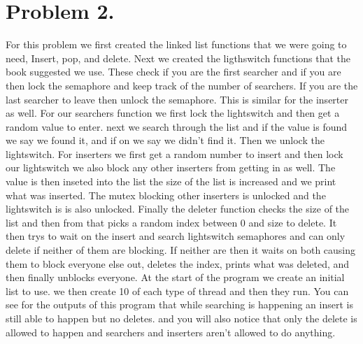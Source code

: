 \documentclass[letterpaper,10pt,titlepage]{article}
\begin{document}
\section{Problem 2.} For this problem we first created the linked list functions 
that we were going to need, Insert, pop, and delete. Next we created the 
ligthswitch functions that the book suggested we use. These check if you are 
the first searcher and if you are then lock the semaphore and keep track of 
the number of searchers. If you are the last searcher to leave then unlock 
the semaphore. This is similar for the inserter as well. For our searchers 
function we first lock the lightswitch and then get a random value to enter. 
next we search through the list and if the value is found we say we found it, 
and if on we say we didn't find it. Then we unlock the lightswitch. For 
inserters we first get a random number to insert and then lock our lightswitch 
we also block any other inserters from getting in as well. The value is then 
inseted into the list the size of the list is increased and we print what was 
inserted. The mutex blocking other inserters is unlocked and the lightswitch is 
is also unlocked. Finally the deleter function checks the size of the list and 
then from that picks a random index between 0 and size to delete. It then trys 
to wait on the insert and search lightswitch semaphores and can only delete 
if neither of them are blocking. If neither are then it waits on both causing 
them to block everyone else out, deletes the index, prints what was deleted, 
and then finally unblocks everyone. At the start of the program we create an 
initial list to use. we then create 10 of each type of thread and then they 
run. You can see for the outputs of this program that while searching is 
happening an insert is still able to happen but no deletes. and you will 
also notice that only the delete is allowed to happen and searchers and 
inserters aren't allowed to do anything.
\end{document}
